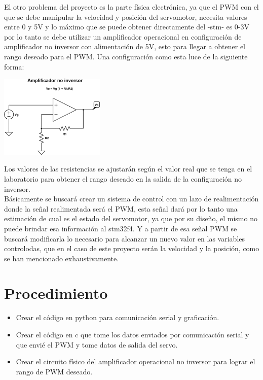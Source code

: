 \documentclass[letterpaper]{article}
\begin{document}
El otro problema del proyecto es la parte física electrónica, ya que el PWM con el que se debe manipular la velocidad y posición del servomotor, necesita valores entre 0 y 5V y lo máximo que se puede obtener directamente del -stm- es 0-3V por lo tanto se debe utilizar un amplificador operacional en configuración de amplificador no inversor con alimentación de 5V, esto para llegar a obtener el rango deseado para el PWM. Una configuración como esta luce de la siguiente forma:\\

\begin{center}
\includegraphics[width=5cm]{amp.png}
\end{center}

Los valores de las resistencias se ajustarán según el valor real que se tenga en el laboratorio para obtener el rango deseado en la salida de la configuración no inversor.\\

Básicamente se buscará crear un sistema de control con un lazo de realimentación donde la señal realimentada será el PWM, esta señal dará por lo tanto una estimación de cual es el estado del servomotor, ya que por su diseño, el mismo no puede brindar esa información al stm32f4. Y a partir de esa señal PWM se buscará modificarla lo necesario para alcanzar un nuevo valor en las variables controlodas, que en el caso de este proyecto serán la velocidad y la posición, como se han mencionado exhaustivamente.

\section{Procedimiento}
\begin{itemize}
\item Crear el código en python para comunicación serial y graficación.
\item Crear el código en c que tome los datos enviados por comunicación serial y que envié el PWM y tome datos de salida del servo.
\item Crear el circuito físico del amplificador operacional no inversor para lograr el rango de PWM deseado.
\end{itemize}
\end{document}
